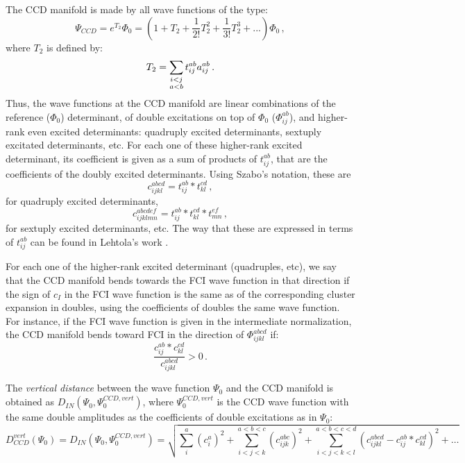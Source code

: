 The CCD manifold is made by all wave functions of the type:
\begin{equation}
  \Psi_{CCD} = e^{T_2} \Phi_0 = (1 + T_2 + \frac{1}{2!}T_2^2 + \frac{1}{3!}T_2^3 + ...) \Phi_0\,,
\end{equation}
where $T_2$ is defined by:
\begin{equation}
  T_2 = \sum_{\mathclap{\substack{
        i<j\\
        a<b}}} t_{ij}^{ab} a_{ij}^{ab}\,.
\end{equation}
Thus, the wave functions at the CCD manifold are linear combinations of the reference ($\Phi_0$) determinant,
of double excitations on top of $\Phi_0$ ($\Phi_{ij}^{ab}$), and higher-rank even excited determinants:
quadruply excited determinants, sextuply excitated determinants, etc.
For each one of these higher-rank excited determinant, its coefficient is given as a sum of products
of $t_{ij}^{ab}$, that are the coefficients of the doubly excited determinants.
Using Szabo's notation, these are
\begin{equation}
  c_{ijkl}^{abcd} = t_{ij}^{ab} * t_{kl}^{cd}\,,
\end{equation}
for quadruply excited determinants,
\begin{equation}
  c_{ijklmn}^{abcdef} = t_{ij}^{ab} * t_{kl}^{cd} * t_{mn}^{ef}\,,
\end{equation}
for sextuply excited determinants, etc.
The way that these are expressed in terms of $t_{ij}^{ab}$ can be found in Lehtola's work \cite{}.

For each one of the higher-rank excited determinant (quadruples, etc),
we say that the CCD manifold bends towards the FCI wave function in that direction if
the sign of $c_I$ in the FCI wave function is the same as of the corresponding cluster expansion
in doubles, using the coefficients of doubles the same wave function.
For instance, if the FCI wave function is given in the intermediate normalization,
the CCD manifold bends toward FCI in the direction of $\Phi_{ijkl}^{abcd}$ if:
\begin{equation}
  \frac{c_{ij}^{ab} * c_{kl}^{cd}}{c_{ijkl}^{abcd}} > 0\,.
\end{equation}

The \emph{vertical distance} between the wave function $\Psi_0$ and the CCD manifold is obtained as
$D_{IN}(\Psi_0, \Psi_0^{CCD,vert})$, where $\Psi_0^{CCD,vert}$ is the CCD wave function
with the same double amplitudes as the coefficients of double excitations as in $\Psi_0$:
\begin{equation}
  D_{CCD}^{vert}(\Psi_0) = 
  D_{IN}(\Psi_0, \Psi_0^{CCD,vert}) = \sqrt{
    \sum_i^a (c_i^a)^2 + \sum_{i<j<k}^{a<b<c} (c_{ijk}^{abc})^2 + \sum_{i<j<k<l}^{a<b<c<d}(c_{ijkl}^{abcd} - c_{ij}^{ab} * c_{kl}^{cd})^2 + \dots
  }
\end{equation}

